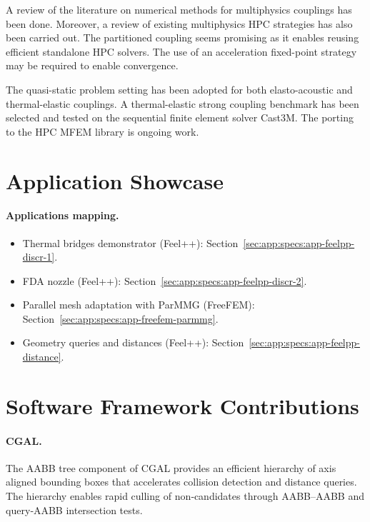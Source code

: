 A review of the literature on numerical methods for multiphysics couplings has been done. Moreover, a review of existing multiphysics HPC strategies has also been carried out. The partitioned coupling seems promising as it enables reusing efficient standalone HPC solvers. The use of an acceleration fixed-point strategy may be required to enable convergence.

The quasi-static problem setting has been adopted for both elasto-acoustic and thermal-elastic couplings. A thermal-elastic strong coupling benchmark has been selected and tested on the sequential finite element solver Cast3M. The porting to the HPC MFEM library is ongoing work.



\section{Application Showcase}

%   

\paragraph{Applications mapping.}
\begin{itemize}
    \item Thermal bridges demonstrator (Feel++): Section~\ref{sec:app:specs:app-feelpp-discr-1}.
    \item FDA nozzle (Feel++): Section~\ref{sec:app:specs:app-feelpp-discr-2}.
    \item Parallel mesh adaptation with ParMMG (FreeFEM): Section~\ref{sec:app:specs:app-freefem-parmmg}.
    \item Geometry queries and distances (Feel++): Section~\ref{sec:app:specs:app-feelpp-distance}.
\end{itemize}

\section{Software Framework Contributions}

\paragraph{CGAL.} The AABB tree component of CGAL provides an efficient hierarchy of axis aligned bounding boxes that accelerates collision detection and distance queries. The hierarchy enables rapid culling of non‑candidates through AABB–AABB and query‑AABB intersection tests.  

